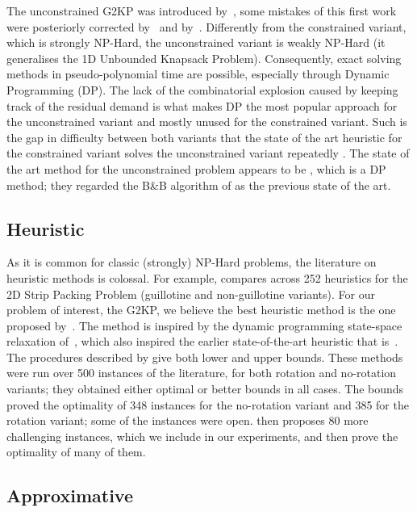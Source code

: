 \documentclass[ppgc,tese,english,formais,babel]{iiufrgs}
\begin{document}
The unconstrained G2KP was introduced by~\citet{gg:1965}, some mistakes of this first work were posteriorly corrected by~\citet{herz:1972} and by~\citet{beasley:1985:guillotine}.
Differently from the constrained variant, which is strongly NP-Hard, the unconstrained variant is weakly NP-Hard (it generalises the 1D Unbounded Knapsack Problem).
Consequently, exact solving methods in pseudo-polynomial time are possible, especially through Dynamic Programming (DP).
The lack of the combinatorial explosion caused by keeping track of the residual demand is what makes DP the most popular approach for the unconstrained variant and mostly unused for the constrained variant.
Such is the gap in difficulty between both variants that the state of the art heuristic for the constrained variant solves the unconstrained variant repeatedly \citep{velasco:2019}.
The state of the art method for the unconstrained problem appears to be \citet{russo:2014}, which is a DP method; they regarded the B\&B algorithm of \citet{kang:2011} as the previous state of the art.

\subsection{Heuristic}

As it is common for classic (strongly) NP-Hard problems, the literature on heuristic methods is colossal.
For example, \citet{ortmann:2010} compares across 252 heuristics for the 2D Strip Packing Problem (guillotine and non-guillotine variants).
For our problem of interest, the G2KP, we believe the best heuristic method is the one proposed by~\citet{velasco:2019}.
The method is inspired by the dynamic programming state-space relaxation of~\citet{nicos:1995:ssr}, which also inspired the earlier state-of-the-art heuristic that is~\citet{morabito:2010}.
The procedures described by \citet{velasco:2019} give both lower and upper bounds.
These methods were run over 500 instances of the literature, for both rotation and no-rotation variants; they obtained either optimal or better bounds in all cases.
The bounds proved the optimality of 348 instances for the no-rotation variant and 385 for the rotation variant; some of the instances were open.
\citet{velasco:2019} then proposes 80 more challenging instances, which we include in our experiments, and then prove the optimality of many of them.

\subsection{Approximative}
\end{document}
